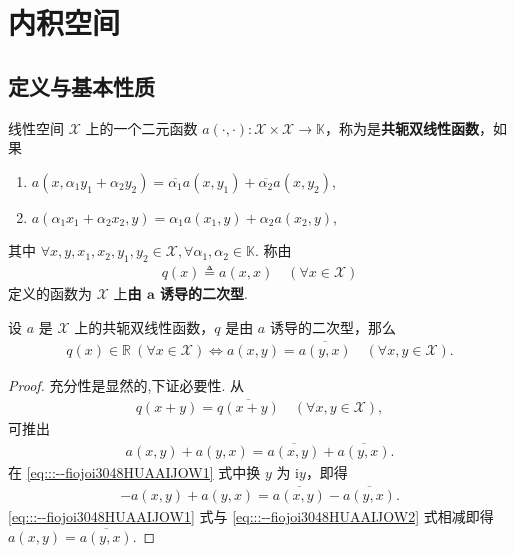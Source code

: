 \documentclass[../../main.tex]{subfiles}%
\begin{document}
\section{内积空间}

\subsection{定义与基本性质}

\begin{definition}
线性空间 $\mathscr{X}$ 上的一个二元函数 $a(\cdot,\cdot):\mathscr{X}\times\mathscr{X}\to\mathbb{K}$，称为是\textbf{共轭双线性函数}，如果
\begin{enumerate}[(1)]
\item $a(x,\alpha_1y_1+\alpha_2y_2)=\overline{\alpha_1}a(x,y_1)+\overline{\alpha_2}a(x,y_2)$,
\item $a(\alpha_1x_1+\alpha_2x_2,y)=\alpha_1a(x_1,y)+\alpha_2a(x_2,y)$,
\end{enumerate}
其中 $\forall x,y,x_1,x_2,y_1,y_2\in\mathscr{X},\forall\alpha_1,\alpha_2\in\mathbb{K}$. 称由
\begin{align*}
q(x)\triangleq a(x,x)\quad(\forall x\in\mathscr{X})
\end{align*}
定义的函数为 $\mathscr{X}$ 上\textbf{由 $\bm{a}$ 诱导的二次型}.
\end{definition}

\begin{proposition}\label{proposition:共轭双线性函数基本性质}
设 $a$ 是 $\mathscr{X}$ 上的共轭双线性函数，$q$ 是由 $a$ 诱导的二次型，那么
\begin{align*}
q(x)\in\mathbb{R}\ (\forall x\in\mathscr{X})\iff a(x,y)=\overline{a(y,x)}\quad(\forall x,y\in\mathscr{X}).
\end{align*}
\end{proposition}
\begin{proof}
充分性是显然的,下证必要性. 从
\begin{align*}
q(x+y)=\overline{q(x+y)}\quad(\forall x,y\in\mathscr{X}),
\end{align*}
可推出
\begin{align}
a(x,y)+a(y,x)=\overline{a(x,y)}+\overline{a(y,x)}.\label{eq:::--fiojoi3048HUAAIJOW1}
\end{align}
在 \eqref{eq:::--fiojoi3048HUAAIJOW1} 式中换 $y$ 为 $\mathrm{i}y$，即得
\begin{align}
-a(x,y)+a(y,x)=\overline{a(x,y)}-\overline{a(y,x)}.\label{eq:::--fiojoi3048HUAAIJOW2}
\end{align}
\eqref{eq:::--fiojoi3048HUAAIJOW1} 式与 \eqref{eq:::--fiojoi3048HUAAIJOW2} 式相减即得 $a(x,y)=\overline{a(y,x)}$.
\end{proof}
\end{document}
